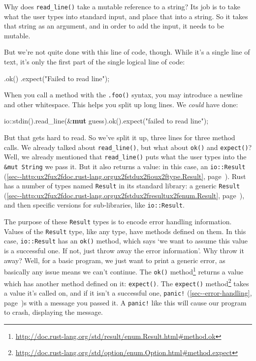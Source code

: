 \documentclass[a4paper,]{book}
\renewcommand*{\hyperref}[2][\ar]{%
  \def\ar{#2}%
  #2 (\autoref{#1}, page~\pageref{#1})}
\newenvironment{Shaded}{\begin{snugshade}}{\end{snugshade}}
\newcommand{\KeywordTok}[1]{\textcolor[rgb]{0.13,0.29,0.53}{\textbf{{#1}}}}
\newcommand{\StringTok}[1]{\textcolor[rgb]{0.31,0.60,0.02}{{#1}}}
\newcommand{\NormalTok}[1]{{#1}}
\renewcommand{\href}[2]{#2\footnote{\url{#1}}}
\begin{document}
Why does \texttt{read\_line()} take a mutable reference to a string? Its
job is to take what the user types into standard input, and place that
into a string. So it takes that string as an argument, and in order to
add the input, it needs to be mutable.

But we're not quite done with this line of code, though. While it's a
single line of text, it's only the first part of the single logical line
of code:

\begin{Shaded}
\begin{Highlighting}[]
        \NormalTok{.ok()}
        \NormalTok{.expect(}\StringTok{"Failed to read line"}\NormalTok{);}
\end{Highlighting}
\end{Shaded}

When you call a method with the \texttt{.foo()} syntax, you may
introduce a newline and other whitespace. This helps you split up long
lines. We \emph{could} have done:

\begin{Shaded}
\begin{Highlighting}[]
    \NormalTok{io::stdin().read_line(&}\KeywordTok{mut} \NormalTok{guess).ok().expect(}\StringTok{"failed to read line"}\NormalTok{);}
\end{Highlighting}
\end{Shaded}

But that gets hard to read. So we've split it up, three lines for three
method calls. We already talked about \texttt{read\_line()}, but what
about \texttt{ok()} and \texttt{expect()}? Well, we already mentioned
that \texttt{read\_line()} puts what the user types into the
\texttt{\&mut\ String} we pass it. But it also returns a value: in this
case, an
\hyperref[sec--http:ux2fux2fdoc.rust-lang.orgux2fstdux2fioux2ftype.Result]{\texttt{io::Result}}.
Rust has a number of types named \texttt{Result} in its standard
library: a generic
\hyperref[sec--http:ux2fux2fdoc.rust-lang.orgux2fstdux2fresultux2fenum.Result]{\texttt{Result}},
and then specific versions for sub-libraries, like \texttt{io::Result}.

The purpose of these \texttt{Result} types is to encode error handling
information. Values of the \texttt{Result} type, like any type, have
methods defined on them. In this case, \texttt{io::Result} has an
\texttt{ok()} method, which says `we want to assume this value is a
successful one. If not, just throw away the error information'. Why
throw it away? Well, for a basic program, we just want to print a
generic error, as basically any issue means we can't continue. The
\href{http://doc.rust-lang.org/std/result/enum.Result.html\#method.ok}{\texttt{ok()}
method} returns a value which has another method defined on it:
\texttt{expect()}. The
\href{http://doc.rust-lang.org/std/option/enum.Option.html\#method.expect}{\texttt{expect()}
method} takes a value it's called on, and if it isn't a successful one,
\hyperref[sec--error-handling]{\texttt{panic!}}s with a message you
passed it. A \texttt{panic!} like this will cause our program to crash,
displaying the message.
\end{document}
